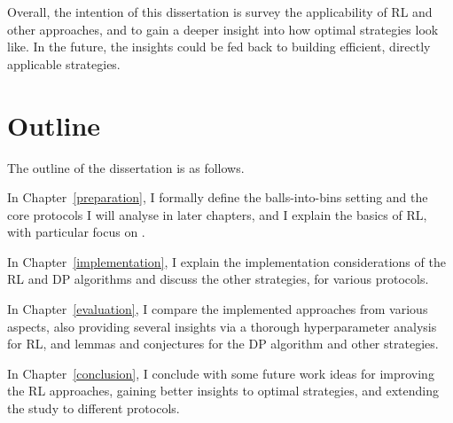 Overall, the intention of this dissertation is survey the applicability of RL and other approaches, and to gain a deeper insight into how optimal strategies look like. In the future, the insights could be fed back to building efficient, directly applicable strategies.


\section{Outline}

The outline of the dissertation is as follows.


In Chapter~\ref{preparation}, I formally define the balls-into-bins setting and the core protocols I will analyse in later chapters, and I explain the basics of RL, with particular focus on \DQL.


In Chapter~\ref{implementation}, I explain the implementation considerations of the RL and DP algorithms and discuss the other strategies, for various protocols.


In Chapter~\ref{evaluation}, I compare the implemented approaches from various aspects, also providing several insights via a thorough hyperparameter analysis for RL, and lemmas and conjectures for the DP algorithm and other strategies.

In Chapter~\ref{conclusion}, I conclude with some future work ideas for improving the RL approaches, gaining better insights to optimal strategies, and extending the study to different protocols.